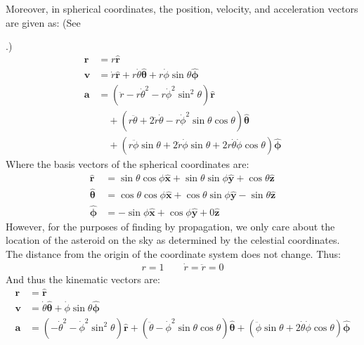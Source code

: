 \documentclass[letterpaper,11pt,english]{sphinxmanual}
\begin{document}
\sphinxAtStartPar
Moreover, in spherical coordinates, the position, velocity, and acceleration
vectors are given as: (See %
\begin{footnote}[68]\sphinxAtStartFootnote
{}
%
\end{footnote}.)
\begin{equation*}
\begin{split}\mathbf{r} &= r \hat{\mathbf{r}} \\
\mathbf{v} &= \dot{r} \hat{\mathbf{r}} + r \dot\theta \hat{\boldsymbol\theta } + r \dot\phi \sin\theta \hat{\boldsymbol\phi} \\
\mathbf{a} &= \left(\ddot{r} - r\dot\theta^2 - r\dot\phi^2\sin^2\theta \right) \hat{\mathbf{r}} \\
 &\quad + \left( r\ddot\theta + 2\dot{r}\dot\theta - r\dot\phi^2\sin\theta\cos\theta \right) \hat{\boldsymbol\theta } \\
 &\quad + \left( r\ddot\phi\sin\theta + 2\dot{r}\dot\phi\sin\theta + 2 r\dot\theta\dot\phi\cos\theta \right) \hat{\boldsymbol\phi}\end{split}
\end{equation*}
\sphinxAtStartPar
Where the basis vectors of the spherical coordinates are:
\begin{equation*}
\begin{split}\hat{\mathbf r} &= \sin\theta \cos\phi \hat{\mathbf x} + \sin\theta \sin\phi \hat{\mathbf y} + \cos\theta \hat{\mathbf z} \\
\hat{\boldsymbol\theta} &= \cos\theta \cos\phi \hat{\mathbf x} + \cos\theta \sin\phi \hat{\mathbf y} - \sin\theta \hat{\mathbf z} \\
\hat{\boldsymbol\phi} &= - \sin\phi \hat{\mathbf x} + \cos\phi \hat{\mathbf y} + 0 \hat{\mathbf z}\end{split}
\end{equation*}
\sphinxAtStartPar
However, for the purposes of finding by propagation, we only care about the
location of the asteroid on the sky as determined by the celestial coordinates.
The distance from the origin of the coordinate system does not change. Thus:
\begin{equation*}
\begin{split}r = 1 \qquad \dot{r} = \ddot{r} = 0\end{split}
\end{equation*}
\sphinxAtStartPar
And thus the kinematic vectors are:
\begin{equation*}
\begin{split}\mathbf{r} &= \hat{\mathbf{r}} \\
\mathbf{v} &=  \dot\theta \hat{\boldsymbol\theta } + \dot\phi \sin\theta \hat{\boldsymbol\phi} \\
\mathbf{a} &= \left(-\dot\theta^2 - \dot\phi^2\sin^2\theta \right) \hat{\mathbf{r}} + \left(\ddot\theta - \dot\phi^2\sin\theta\cos\theta \right) \hat{\boldsymbol\theta } + \left(\ddot\phi\sin\theta  + 2 \dot\theta\dot\phi\cos\theta \right) \hat{\boldsymbol\phi}\end{split}
\end{equation*}
\end{document}
